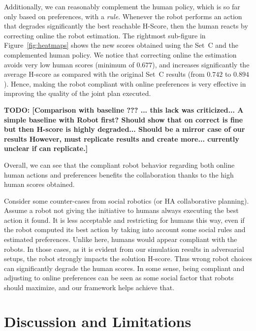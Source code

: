 Additionally, we can reasonably complement the human policy, which is so far only based on preferences, with a \textit{rule}. Whenever the robot performs an action that degrades significantly the best reachable H-Score, then the human reacts by correcting online the robot estimation.
The rightmost sub-figure in Figure~\ref{fig:heatmaps} shows the new scores obtained using the Set~C and the complemented human policy. 
We notice that correcting online the estimation avoids very low human scores (minimum of $0.677$), and increases significantly the average H-score as compared with the original Set~C results (from $0.742$ to $0.894$). Hence, making the robot compliant with online preferences is very effective in improving the quality of the joint plan executed.

\textbf{TODO: [Comparison with baseline ??? ... this lack was criticized... A simple baseline with Robot first? Should show that on correct is fine but then H-score is highly degraded... Should be a mirror case of our results However, must replicate results and create more... currently unclear if can replicate.]}

Overall, we can see that the compliant robot behavior regarding both online human actions and preferences benefits the collaboration thanks to the high human scores obtained.

Consider some counter-cases from social robotics (or HA collaborative planning). Assume a robot not giving the initiative to humans always executing the best action it found. 
It is less acceptable and restricting for humans this way, even if the robot computed its best action by taking into account some social rules and estimated preferences. 
Unlike here, humans would appear compliant with the robots. 
In those cases, as it is evident from our simulation results in adversarial setups, the robot strongly impacts the solution H-score. Thus wrong robot choices can significantly degrade the human scores. In some sense, being compliant and adjusting to online preferences can be seen as some social factor that robots should maximize, and our framework helps achieve that.


\section{Discussion and Limitations}

